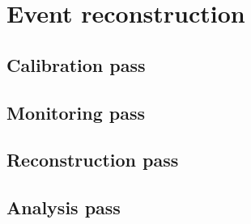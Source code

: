 

\section[Event reconstruction (Alex A.)]{Event reconstruction \label{sec:reconstruction}}
\subsection{Calibration pass \label{sec:reccalibration}}
\subsection{Monitoring pass \label{sec:recmonitoring}}
\subsection{Reconstruction pass \label{sec:recreconstruction}}
\subsection{Analysis pass \label{sec:recanalysis}}
